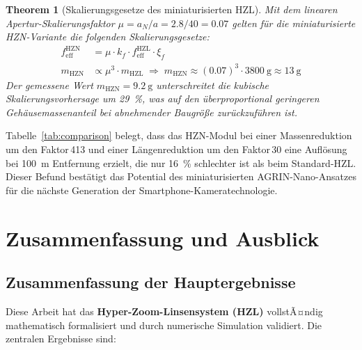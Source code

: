 ﻿\documentclass[12pt,a4paper]{article}
\newtheorem{theorem}{Theorem}[section]
\theoremstyle{definition}
\newcommand{\eff}{\mathrm{eff}}
\begin{document}
	\begin{theorem}[Skalierungsgesetze des miniaturisierten HZL]
		Mit dem linearen Apertur-Skalierungsfaktor
		$\mu = a_N/a = 2.8/40 = 0.07$ gelten f\"ur die miniaturisierte
		HZN-Variante die folgenden Skalierungsgesetze:
		\begin{align}
			f_\eff^\mathrm{HZN}
			&= \mu \cdot k_f \cdot f_\eff^\mathrm{HZL} \cdot \xi_f
			\label{eq:scale_f}\\
			m_\mathrm{HZN}
			&\propto \mu^3 \cdot m_\mathrm{HZL}
			\;\Rightarrow\;
			m_\mathrm{HZN}
			\approx (0.07)^3 \cdot \SI{3800}{\gram}
			\approx \SI{13}{\gram}
			\label{eq:scale_m}
		\end{align}
		Der gemessene Wert $m_\mathrm{HZN} = \SI{9.2}{\gram}$ unterschreitet
		die kubische Skalierungsvorhersage um \SI{29}{\percent}, was auf den
		\"uberproportional geringeren Geh\"ausemassenanteil bei abnehmender
		Baugr\"o{\ss}e zur\"uckzuf\"uhren ist.
	\end{theorem}

	Tabelle~\ref{tab:comparison} belegt, dass das HZN-Modul bei einer
	Massenreduktion um den Faktor\,413 und einer L\"angenreduktion um den
	Faktor\,30 eine Aufl\"osung bei \SI{100}{\metre} Entfernung erzielt,
	die nur \SI{16}{\percent} schlechter ist als beim Standard-HZL.
	Dieser Befund best\"atigt das Potential des miniaturisierten
	AGRIN-Nano-Ansatzes f\"ur die n\"achste Generation der
	Smartphone-Kamera\-technologie.

	\section{Zusammenfassung und Ausblick}
	
	\subsection{Zusammenfassung der Hauptergebnisse}
	
	Diese Arbeit hat das \textbf{Hyper-Zoom-Linsensystem (HZL)} vollstÃ¤ndig
	mathematisch formalisiert und durch numerische Simulation validiert.
	Die zentralen Ergebnisse sind:
	
\end{document}
